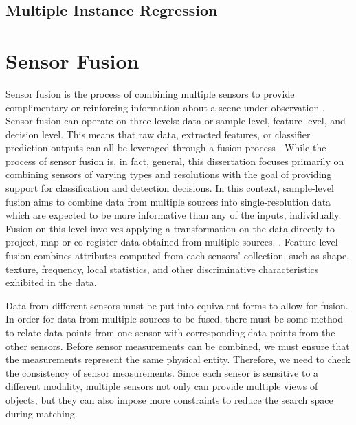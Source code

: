 \subsection{Multiple Instance Regression}


\section{Sensor Fusion}

	Sensor fusion is the process of combining multiple sensors to provide complimentary or reinforcing information about a scene under observation \cite{hackett1990multisensorfusion,zhang2010multisourceremotingsensingfusion}.  Sensor fusion can operate on three levels: data or sample level, feature level, and decision level.  This  means that raw data, extracted features, or classifier prediction outputs can all be leveraged through a fusion process \cite{Ruta2000OverviewClassifierFusionMethods,zhang2010multisourceremotingsensingfusion}. While the process of sensor fusion is, in fact, general, this dissertation focuses primarily on combining sensors of varying types and resolutions with the goal of providing support for classification and detection decisions. In this context, sample-level fusion aims to combine data from multiple sources into single-resolution data which are expected to be more informative than any of the inputs, individually.  Fusion on this level involves applying a transformation on the data directly to project, map or co-register data obtained from multiple sources. \cite{zhang2010multisourceremotingsensingfusion,Du2017Thesis}.  Feature-level fusion combines attributes computed from each sensors' collection, such as shape, texture, frequency, local statistics, and other discriminative characteristics exhibited in the data.
	
	Data from different sensors must be put into equivalent forms to allow for fusion.  In order for data from multiple sources to be fused, there must be some method to relate data points from one sensor with corresponding data points from the other sensors.  Before sensor measurements can be combined, we must ensure that the measurements represent the same physical entity. Therefore, we need to check the consistency of sensor measurements.  Since each sensor is sensitive to a different modality, multiple sensors not only can provide multiple views of objects, but they can also impose more constraints to reduce the search	space during matching.


